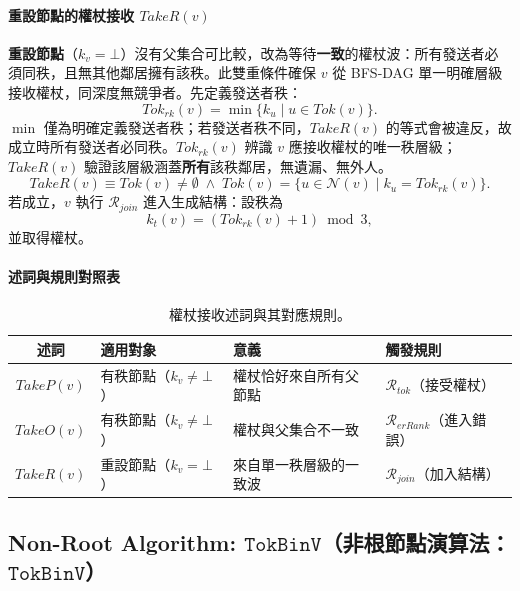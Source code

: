 \documentclass[a4paper, 12pt]{article}
\newcommand{\rk}{k}
\newcommand{\RerRank}{\mathscr{R}_{erRank}}
\newcommand{\Rjoin}{\mathscr{R}_{join}}
\newcommand{\Rtok}{\mathscr{R}_{tok}}
\begin{document}
\paragraph{重設節點的權杖接收 \(\mathit{TakeR}(v)\)}
\textbf{重設節點}（\(\rk_v=\bot\)）沒有父集合可比較，改為等待\textbf{一致}的權杖波：所有發送者必須同秩，且無其他鄰居擁有該秩。此雙重條件確保 \(v\) 從 BFS-DAG 單一明確層級接收權杖，同深度無競爭者。先定義發送者秩：
\[
\mathit{Tok}_{rk}(v)=\min\{\rk_u\mid u\in\mathit{Tok}(v)\}.
\]
\(\min\) 僅為明確定義發送者秩；若發送者秩不同，\(\mathit{TakeR}(v)\) 的等式會被違反，故成立時所有發送者必同秩。\(\mathit{Tok}_{rk}(v)\) 辨識 \(v\) 應接收權杖的唯一秩層級；\(\mathit{TakeR}(v)\) 驗證該層級涵蓋\textbf{所有}該秩鄰居，無遺漏、無外人。
\[
\mathit{TakeR}(v)\equiv \mathit{Tok}(v)\neq\emptyset\;\wedge\;\mathit{Tok}(v)=\{u\in\mathcal{N}(v)\mid \rk_u=\mathit{Tok}_{rk}(v)\}.
\]
若成立，\(v\) 執行 \(\Rjoin\) 進入生成結構：設秩為
\[
\rk_t(v)=(\mathit{Tok}_{rk}(v)+1)\bmod 3,
\]
並取得權杖。

\paragraph{述詞與規則對照表}
\begin{table}[h]
\centering
\renewcommand{\arraystretch}{1.4}
\begin{tabular}{c l l l}
\hline
\textbf{述詞} & \textbf{適用對象} & \textbf{意義} & \textbf{觸發規則} \\
\hline
\(\mathit{TakeP}(v)\) & 有秩節點（\(\rk_v\neq\bot\)） & 權杖恰好來自所有父節點 & \(\Rtok\)（接受權杖） \\
\(\mathit{TakeO}(v)\) & 有秩節點（\(\rk_v\neq\bot\)） & 權杖與父集合不一致 & \(\RerRank\)（進入錯誤） \\
\(\mathit{TakeR}(v)\) & 重設節點（\(\rk_v=\bot\)） & 來自單一秩層級的一致波 & \(\Rjoin\)（加入結構） \\
\hline
\end{tabular}
\caption{權杖接收述詞與其對應規則。}
\label{tab:take-zh}
\end{table}

\subsection{Non-Root Algorithm: \(\mathtt{TokBinV}\)（非根節點演算法：\(\mathtt{TokBinV}\)）}
\label{subsec:TokBinV}
\end{document}

